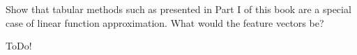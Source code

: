 
\begin{exercise}

Show that tabular methods such as presented in Part I of this book are a special case of linear function approximation.
What would the feature vectors be?

\end{exercise}


\begin{solution}

ToDo!

\end{solution}


